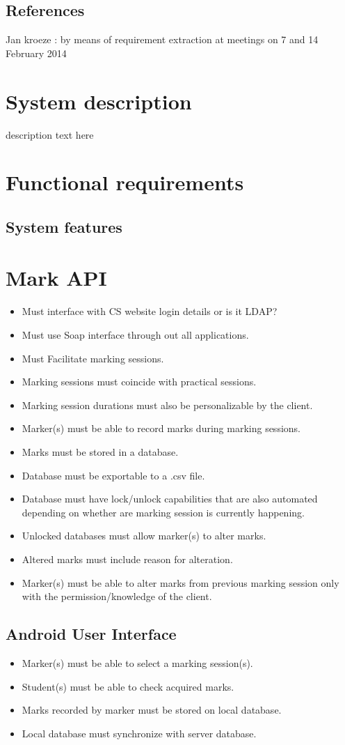 \documentclass[10pt,a4paper]{article}
\begin{document}
\subsection{References}

Jan kroeze : by means of requirement extraction at meetings on 7 and 14 February 2014

\section{System description}
description text here
\section{Functional requirements}
	\subsection{System features}
	\section*{Mark API}
	\begin{itemize}
		\item Must interface with CS website login details or is it LDAP?
		\item Must use Soap interface through out all applications.
		\item Must Facilitate marking sessions.
		\item Marking sessions must coincide with practical sessions.
		\item Marking session durations must also be personalizable by the client.
		\item Marker(s) must be able to record marks during marking sessions.
		\item Marks must be stored in a database.
		\item Database must be exportable to a .csv file.
		\item Database must have lock/unlock capabilities that are also automated depending on whether are marking session is currently happening.
		\item Unlocked databases must allow marker(s) to alter marks.
		\item Altered marks must include reason for alteration.
		\item Marker(s) must be able to alter marks from previous marking session only with the permission/knowledge of the client.
	\end{itemize}
	\subsection*{Android User Interface}
	\begin{itemize}
		\item Marker(s) must be able to select a marking session(s).
		\item Student(s) must be able to check acquired marks.
		\item Marks recorded by marker must be stored on local database.
		\item Local database must synchronize with server database.
	\end{itemize}
\end{document}
